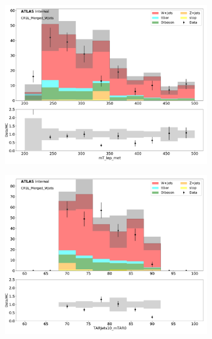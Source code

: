 \begin{figure}[htbp]
  \centering
     \begin{subfigure}{0.49\textwidth}
     \includegraphics[width = 0.98\textwidth]{Figures/4/datamc/CR1L_Merged_WJets/mT_lep_met.pdf}
    \caption{\mtlepmet}
     \end{subfigure}
    \begin{subfigure}{0.49\textwidth}
     \includegraphics[width = 0.98\textwidth]{Figures/4/datamc/CR1L_Merged_WJets/TARJets10_mTAR0.pdf}
     \caption{\mTAR}
     \end{subfigure}
    \begin{subfigure}{0.49\textwidth}

\end{subfigure}
\end{figure}
